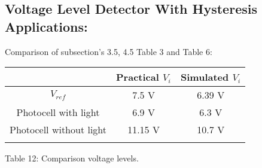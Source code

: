 \subsection{Voltage Level Detector With Hysteresis Applications:}

Comparison of subsection's 3.5, 4.5 Table 3 and Table 6: \hfill \break

\begin{center}
\begin{tabular}[.5cm]{c c c}
\toprule
\toprule
\hspace{100pt} & \hspace{50pt} Practical $V_{i}$ \hspace{50pt} & \hspace{50pt} Simulated $V_{i}$ \hspace{50pt}  \\
\midrule
\midrule
$V_{ref}$ & 7.5 V & 6.39 V \\
\cmidrule{1-3}
Photocell with light & 6.9 V & 6.3 V \\
\cmidrule{1-3}
Photocell without light & 11.15 V & 10.7 V \\
\bottomrule
\linebreak
\end{tabular}
\linebreak Table 12: Comparison voltage levels.
\end{center} \hfill

\pagebreak
